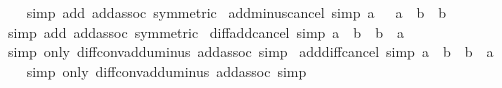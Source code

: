 \begin{isabellebody}
%
\isadelimproof
\ \ %
\endisadelimproof
%
\isatagproof
{}\isamarkupfalse%
\ {\isacharparenleft}{\kern0pt}simp\ add{\isacharcolon}{\kern0pt}\ add{\isachardot}{\kern0pt}assoc\ {\isacharbrackleft}{\kern0pt}symmetric{\isacharbrackright}{\kern0pt}{\isacharparenright}{\kern0pt}%
\endisatagproof
{\isafoldproof}%
%
\isadelimproof
\isanewline
%
\endisadelimproof
\isanewline
{}\isamarkupfalse%
\ add{\isacharunderscore}{\kern0pt}minus{\isacharunderscore}{\kern0pt}cancel\ {\isacharbrackleft}{\kern0pt}simp{\isacharbrackright}{\kern0pt}{\isacharcolon}{\kern0pt}\ {\isachardoublequoteopen}a\ {\isacharplus}{\kern0pt}\ {\isacharparenleft}{\kern0pt}{\isacharminus}{\kern0pt}\ a\ {\isacharplus}{\kern0pt}\ b{\isacharparenright}{\kern0pt}\ {\isacharequal}{\kern0pt}\ b{\isachardoublequoteclose}\isanewline
%
\isadelimproof
\ \ %
\endisadelimproof
%
\isatagproof
{}\isamarkupfalse%
\ {\isacharparenleft}{\kern0pt}simp\ add{\isacharcolon}{\kern0pt}\ add{\isachardot}{\kern0pt}assoc\ {\isacharbrackleft}{\kern0pt}symmetric{\isacharbrackright}{\kern0pt}{\isacharparenright}{\kern0pt}%
\endisatagproof
{\isafoldproof}%
%
\isadelimproof
\isanewline
%
\endisadelimproof
\isanewline
{}\isamarkupfalse%
\ diff{\isacharunderscore}{\kern0pt}add{\isacharunderscore}{\kern0pt}cancel\ {\isacharbrackleft}{\kern0pt}simp{\isacharbrackright}{\kern0pt}{\isacharcolon}{\kern0pt}\ {\isachardoublequoteopen}a\ {\isacharminus}{\kern0pt}\ b\ {\isacharplus}{\kern0pt}\ b\ {\isacharequal}{\kern0pt}\ a{\isachardoublequoteclose}\isanewline
%
\isadelimproof
\ \ %
\endisadelimproof
%
\isatagproof
{}\isamarkupfalse%
\ {\isacharparenleft}{\kern0pt}simp\ only{\isacharcolon}{\kern0pt}\ diff{\isacharunderscore}{\kern0pt}conv{\isacharunderscore}{\kern0pt}add{\isacharunderscore}{\kern0pt}uminus\ add{\isachardot}{\kern0pt}assoc{\isacharparenright}{\kern0pt}\ simp%
\endisatagproof
{\isafoldproof}%
%
\isadelimproof
\isanewline
%
\endisadelimproof
\isanewline
{}\isamarkupfalse%
\ add{\isacharunderscore}{\kern0pt}diff{\isacharunderscore}{\kern0pt}cancel\ {\isacharbrackleft}{\kern0pt}simp{\isacharbrackright}{\kern0pt}{\isacharcolon}{\kern0pt}\ {\isachardoublequoteopen}a\ {\isacharplus}{\kern0pt}\ b\ {\isacharminus}{\kern0pt}\ b\ {\isacharequal}{\kern0pt}\ a{\isachardoublequoteclose}\isanewline
%
\isadelimproof
\ \ %
\endisadelimproof
%
\isatagproof
{}\isamarkupfalse%
\ {\isacharparenleft}{\kern0pt}simp\ only{\isacharcolon}{\kern0pt}\ diff{\isacharunderscore}{\kern0pt}conv{\isacharunderscore}{\kern0pt}add{\isacharunderscore}{\kern0pt}uminus\ add{\isachardot}{\kern0pt}assoc{\isacharparenright}{\kern0pt}\ simp%

\end{isabellebody}
